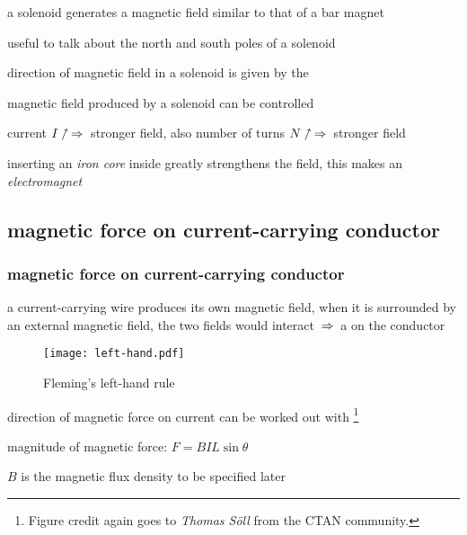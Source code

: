 \cmt a solenoid generates a magnetic field similar to that of a bar magnet

useful to talk about the north and south poles of a solenoid

\cmt direction of magnetic field in a solenoid is given by the 


\cmt magnetic field produced by a solenoid can be controlled

current $I\nnearrow \, \Rightarrow \, $ stronger field, also number of turns $N\nnearrow\, \Rightarrow \, $ stronger field

\cmt inserting an \emph{iron core} inside greatly strengthens the field, this makes an \emph{electromagnet}



\subsection{magnetic force on current-carrying conductor}

\subsubsection{magnetic force on current-carrying conductor}

a current-carrying wire produces its own magnetic field, when it is surrounded by an external magnetic field, the two fields would interact $\, \Rightarrow \,$ a  on the conductor

\begin{wrapfigure}{r}{0.4\textwidth}
	\vspace*{-16pt}
	\centering
	\texttt{[image: left-hand.pdf]}
	
	Fleming's left-hand rule
	\vspace*{-16pt}
\end{wrapfigure}

\cmt direction of magnetic force on current can be worked out with \footnote{Figure credit again goes to \emph{Thomas S\"{o}ll} from the CTAN community.}

\cmt magnitude of magnetic force: $\boxed{F=BIL\sin\theta}$

$B$ is the magnetic flux density to be specified later

